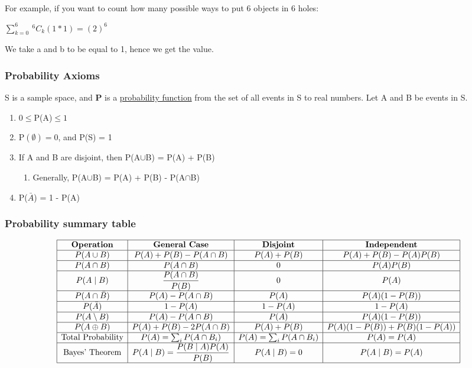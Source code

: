 \documentclass{article}
\begin{document}
For example, if you want to count how many possible ways to put 6 objects in 6 holes:
\begin{center}
    $\sum_{k=0}^{6}\ ^6C_k(1*1) = (2)^6$
\end{center}
We take a and b to be equal to 1, hence we get the value.

\subsubsection{Probability Axioms}
S is a sample space, and \textbf{P} is a \underline{probability function} from the set of all events in S to real numbers. Let A and B be events in S.
\begin{enumerate}
    \item $0 \leq $P(A)$ \leq 1$
    \item P$(\emptyset) = 0$, and P(S) = 1
    \item If A and B are disjoint, then P(A$\cup$B) = P(A) + P(B)
    \begin{enumerate}
        \item Generally, P(A$\cup$B) = P(A) + P(B) - P(A$\cap$B)
    \end{enumerate}
    \item P($\bar{A}$) = 1 - P(A)
\end{enumerate}

\subsubsection{Probability summary table}
\[
\begin{array}{|c|c|c|c|}
\hline
\textbf{Operation} & \textbf{General Case} & \textbf{Disjoint} & \textbf{Independent} \\ \hline
P(A \cup B) & P(A) + P(B) - P(A \cap B) & P(A) + P(B) & P(A) + P(B) - P(A)P(B) \\ \hline
P(A \cap B) & P(A \cap B) & 0 & P(A)P(B) \\ \hline
P(A \mid B) & \dfrac{P(A \cap B)}{P(B)} & 0 & P(A) \\ \hline
P(A \cap \bar{B}) & P(A) - P(A \cap B) & P(A) & P(A)(1 - P(B)) \\ \hline
P(\bar{A}) & 1 - P(A) & 1 - P(A) & 1 - P(A) \\ \hline
P(A \setminus B) & P(A) - P(A \cap B) & P(A) & P(A)(1 - P(B)) \\ \hline
P(A \oplus B) & P(A) + P(B) - 2P(A \cap B) & P(A) + P(B) & P(A)(1 - P(B)) + P(B)(1 - P(A)) \\ \hline
\text{Total Probability} & P(A) = \sum_i P(A \cap B_i) & P(A) = \sum_i P(A \cap B_i) & P(A) = P(A) \\ \hline
\text{Bayes' Theorem} & P(A \mid B) = \dfrac{P(B \mid A)P(A)}{P(B)} & P(A \mid B) = 0 & P(A \mid B) = P(A) \\ \hline
\end{array}
\]
\end{document}
